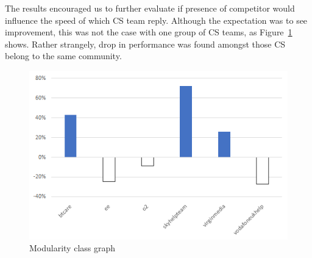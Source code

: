 \documentclass[sigconf]{acmart}
\begin{document}
The results encouraged us to further evaluate if presence of
competitor would influence the speed of which CS team reply. Although
the expectation was to see improvement, this was not the case with one
group of CS teams, as Figure~\ref{fig:diffdelaymeans} shows. Rather
strangely, drop in performance was found amongst those CS belong to
the same community.

\begin{figure}[htb]
\centering
\includegraphics[width=\columnwidth]{images/diffdelaymeans.png}
\caption{Modularity class graph}
\label{fig:diffdelaymeans}
\end{figure}


\end{document}
